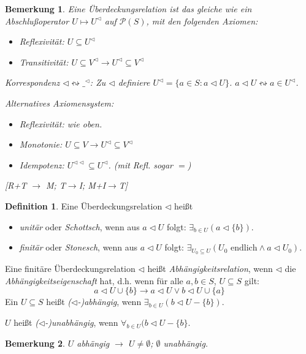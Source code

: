 \documentclass[headsepline=true,DIV=11]{scrartcl}
\newtheorem{remark}{Bemerkung}
\theoremstyle{definition}
\newtheorem*{definition}{Definition}
\begin{document}
\begin{remark}
	Eine Überdeckungsrelation ist das gleiche wie ein {\em Abschlußoperator} $U\mapsto U^{\lhd}$ auf $\mathcal P(S)$, mit den folgenden Axiomen:
	\begin{itemize}
		\item {\em Reflexivität}: $U\subseteq U^\lhd$
		\item {\em Transitivität}: $U\subseteq V^\lhd \to U^\lhd \subseteq V^\lhd$ %
	\end{itemize}
	Korrespondenz $\lhd \leftrightsquigarrow \_^{\lhd}$:
	Zu $\lhd$ definiere $U^\lhd= \{a\in S: a\lhd U\}$.
	$a\lhd U \leftrightsquigarrow a\in U^\lhd$.

	Alternatives Axiomensystem:
	\begin{itemize}
		\item Reflexivität: wie oben.
		\item Monotonie: $U\subseteq V \to U^\lhd \subseteq V^\lhd$
		\item Idempotenz: $U^{\lhd\lhd} \subseteq U^{\lhd}$. (mit Refl. sogar $=$)
	\end{itemize}
	[R+T $\to$ M; T$\to$I; M+I$\to$T]
\end{remark}

\begin{definition}
	Eine Überdeckungsrelation $\lhd$ heißt
	\begin{itemize}
		\item {\em unitär} oder {\em Schottsch}, wenn aus $a\lhd U$ folgt: $\exists_{b\in U}(a\lhd\{b\})$.
		\item {\em finitär} oder {\em Stonesch}, wenn aus $a\lhd U$ folgt: $\exists_{U_0\subseteq U} (U_0 \text{ endlich} \land a\lhd U_0)$.
	\end{itemize}
	Eine finitäre Überdeckungsrelation $\lhd$ heißt {\em Abhängigkeitsrelation}, wenn $\lhd$ die {\em Abhängigkeitseigenschaft} hat, d.h.
	wenn für alle $a,b\in S$, $U\subseteq S$ gilt: 
	\[ a\lhd U\cup\{b\}\to a\lhd U\lor b\lhd U\cup\{a\}\]
	Ein $U\subseteq S$ heißt {\em ($\lhd$-)abhängig}, wenn $\exists_{b\in U}(b\lhd U-\{b\})$.
	
	$U$ heißt {\em ($\lhd$-)unabhängig}, wenn  $\forall_{b\in U}(b\lhd U-\{b\}$.
\end{definition}

\begin{remark}
	$U$ abhängig $\to$ $U\neq\emptyset$; $\emptyset$ unabhängig.
\end{remark}
\end{document}
